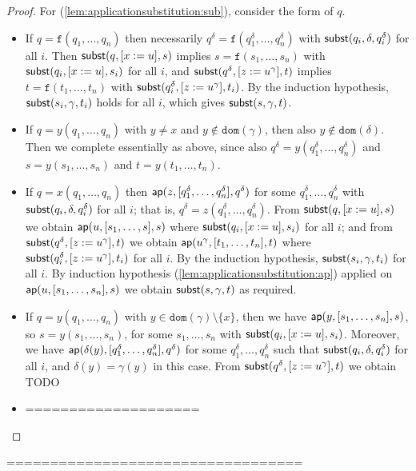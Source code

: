 \documentclass{lmcs}
\theoremstyle{theorem}\newtheorem{theorem}[dummy]{Theorem}
\theoremstyle{theorem}\newtheorem{lemma}[dummy]{Lemma}
\theoremstyle{theorem}\newtheorem{corollary}[dummy]{Corollary}
\theoremstyle{definition}\newtheorem{definition}[dummy]{Definition}
\theoremstyle{definition}\newtheorem{example}[dummy]{Example}
\newcommand{\domain}{\mathtt{dom}}
\newcommand{\identifier}[1]{\mathtt{#1}}
\newcommand{\afun}{\identifier{f}}
\begin{document}
\begin{proof}
For (\ref{lem:applicationsubstitution:sub}), consider the form of $q$.
\begin{itemize}
\item If $q = \afun(q_1,\dots,q_n)$ then necessarily $q^\delta = \afun(q_1^\delta,\dots,q_n^\delta)$
  with $\mathsf{subst}(q_i,\delta,q_i^\delta)$ for all $i$.
  Then $\mathsf{subst}(q,[x:=u],s)$ implies $s = \afun(s_1,\dots,s_n)$ with $\mathsf{subst}(q_i,[x:=u],s_i)$ for
  all $i$, and $\mathsf{subst}(q^\delta,[z:=u^\gamma],t)$ implies $t = \afun(t_1,\dots,t_n)$ with
  $\mathsf{subst}(q_i^\delta,[z:=u^\gamma],t_i)$. By the induction hypothesis, $\mathsf{subst}(s_i,\gamma,t_i)$
  holds for all $i$, which gives $\mathsf{subst}(s,\gamma,t)$.
\item If $q = y(q_1,\dots,q_n)$ with $y \neq x$ and $y \notin \domain(\gamma)$, then also
  $y \notin \domain(\delta)$. Then we complete essentially as above, since also $q^\delta =
  y(q_1^\delta,\dots,q_n^\delta)$ and $s = y(s_1,\dots,s_n)$ and $t = y(t_1,\dots,t_n)$.
\item If $q = x(q_1,\dots,q_n)$ then $\mathsf{ap}(z,[q_1^\delta,\dots,q_n^\delta],q^\delta)$ for some
  $q_1^\delta,\dots,q_n^\delta$ with $\mathsf{subst}(q_i,\delta,q_i^\delta)$ for all $i$; that is,
  $q^\delta = z(q_1^\delta,\dots,q_n^\delta)$.
  From $\mathsf{subst}(q,[x:=u],s)$ we obtain $\mathsf{ap}(u,[s_1,\dots,s],s)$ where $\mathsf{subst}(q_i,[x:=u],s_i)$
  for all $i$;
  and from $\mathsf{subst}(q^\delta,[z:=u^\gamma],t)$ we obtain $\mathsf{ap}(u^\gamma,[t_1,\dots,t_n],t)$ where
  $\mathsf{subst}(q_i^\delta,[z:=u^\gamma],t_i)$ for all $i$.
  By the induction hypothesis, $\mathsf{subst}(s_i,\gamma,t_i)$ for all $i$.
  By induction hypothesis (\ref{lem:applicationsubstitution:ap}) applied on
  $\mathsf{ap}(u,[s_1,\dots,s_n],s)$ we obtain $\mathsf{subst}(s,\gamma,t)$ as required.
\item If $q = y(q_1,\dots,q_n)$ with $y \in \domain(\gamma) \setminus \{x\}$, then we have
  $\mathsf{ap}(y,[s_1,\dots,s_n],s)$, so $s = y(s_1,\dots,s_n)$, for some $s_1,\dots,s_n$ with
  $\mathsf{subst}(q_i,[x:=u],s_i)$.  Moreover, we have $\mathsf{ap}(\delta(y),[q_1^\delta,\dots,q_n^\delta],
  q^\delta)$ for some $q_1^\delta,\dots,q_n^\delta$ such that $\mathsf{subst}(q_i,\delta,q_i^\delta)$
  for all $i$, and $\delta(y) = \gamma(y)$ in this case.
  From $\mathsf{subst}(q^\delta,[z:=u^\gamma],t)$ we obtain TODO
\item ====================
\end{itemize}
\end{proof}

==================================
\end{document}
